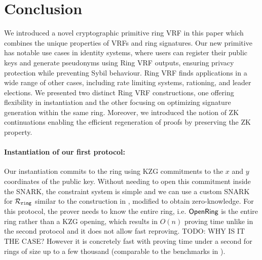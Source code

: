 \section{Conclusion}
\label{sec:conclusion}

We introduced a novel cryptographic primitive ring VRF in this paper which combines the unique properties of VRFs  and ring signatures. Our new primitive has notable use cases in identity systems, where users can register their public keys and generate pseudonyms using Ring VRF outputs, ensuring privacy protection while preventing Sybil behaviour. Ring VRF finds applications in a wide range of other cases, including rate limiting systems, rationing, and leader elections. We presented two distinct Ring VRF constructions, one offering flexibility in instantiation and the other focusing on optimizing signature generation within the same ring. Moreover, we introduced the notion of ZK continuations enabling the efficient regeneration of proofs by preserving the ZK property.

\paragraph{Instantiation of our first protocol:}  Our instantiation commits to the ring using KZG commitments to the $ x $ and $ y $ coordinates of the public key. Without needing to open this commitment inside the SNARK, the constraint system is simple and we can use a custom SNARK for $\mathcal{R}_{\mathtt{ring}}$ similar to the construction in \cite{accountable}, modified to obtain zero-knowledge.  For this protocol, the prover needs to know the entire ring, i.e. ${\mathsf{OpenRing}}$ is the entire ring rather than a KZG opening, which results in $O(n)$ proving time unlike in the second protocol and it does not allow fast reproving.
TODO: WHY IS IT THE CASE?
 However it is concretely fast with proving time under a second for rings of size up to a few thousand (comparable to the benchmarks in \cite{accountable}).  




